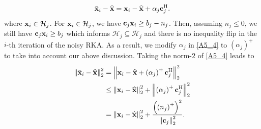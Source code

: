 \documentclass[12pt,draftcls,onecolumn]{IEEEtran}
\begin{document}
\begin{equation}
\label{A5_4}
\bar{\mbx}_{i}-\widehat{\mbx}=\mbx_{i}-\widehat{\mbx}+\alpha_{j}\mbc_{j}^{\mathrm{H}}.
\end{equation}
where $\mathbf{x}_{i}\in\mathcal{H}_j$. For $\mathbf{x}_{i}\in\mathcal{H}_{j}$, we have $\mathbf{c}_{j}\mathbf{x}_{i}\geq b_{j}-n_j$. Then, assuming $n_{j}\leq 0$, we still have $\mathbf{c}_{j}\mathbf{x}_{i}\geq b_{j}$ which informs $\mathcal{H}_{j}\subseteq \bar{\mathcal{H}}_{j}$ and there is no inequality flip in the $i$-th iteration of the noisy RKA. As a result, we modify $\alpha_{j}$ in \eqref{A5_4} to $\left(\alpha_{j}\right)^{+}$ to take into account our above discussion. Taking the norm-$2$ of \eqref{A5_4} leads to
\begin{equation}
\label{A5_5}
\begin{aligned}
\left\|\bar{\mbx}_{i}-\widehat{\mbx}\right\|_{2}^{2}&=\left\|\mbx_{i}-\widehat{\mbx}+\left(\alpha_{j}\right)^{+}\mbc_{j}^{\mathrm{H}}\right\|_{2}^{2}\\&\leq\left\|\mbx_{i}-\widehat{\mbx}\right\|_{2}^{2}+\left\|\left(\alpha_{j}\right)^{+}\mbc_{j}^{\mathrm{H}}\right\|_{2}^{2}\\&=\left\|\mbx_{i}-\widehat{\mbx}\right\|_{2}^{2}+\frac{\left(\left(n_{j}\right)^{+}\right)^2}{\left\|\mbc_{j}\right\|_{2}^{2}}.
\end{aligned}
\end{equation}

\end{document}
